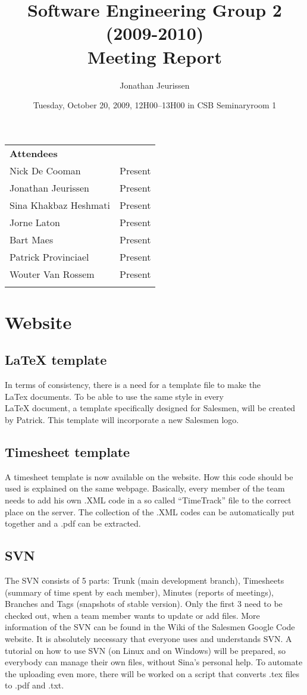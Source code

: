 \documentclass[a4paper, 12pt]{article}
\title{Software Engineering Group 2 (2009-2010) \\Meeting Report}
\author{Jonathan Jeurissen}
\date{ Tuesday, October 20, 2009, 12H00--13H00 in CSB Seminaryroom 1}
\begin{document}
	\maketitle
	
	\begin{tabular}{l l}
		{\large \textbf{Attendees}} \\
		Nick De Cooman & Present \\
		Jonathan Jeurissen & Present \\
		Sina Khakbaz Heshmati & Present \\
		Jorne Laton & Present \\
		Bart Maes & Present \\
		Patrick Provinciael & Present \\
		Wouter Van Rossem & Present \\
		\\
	\end{tabular}	
	
	
	
	
	\section{Website}
	
	\subsection{\LaTeX{} template}
		In terms of consistency, there is a need for a template file to make the \\LaTex{} documents. To be able to use the same style in every \\LaTeX{} document, a template specifically designed for Salesmen, will be created by Patrick. This template will incorporate a new Salesmen logo.
	\subsection{Timesheet template}
A timesheet template is now available on the website\cite{site1}. How this code should be used is explained on the same webpage. Basically, every member of the team needs to add his own .XML code in a so called ``TimeTrack'' file to the correct place on the server. The collection of the .XML codes can be automatically put together and a .pdf can be extracted.
	\subsection{SVN}
The SVN consists of 5 parts: Trunk (main development branch), Timesheets (summary of time spent by each member), Minutes (reports of meetings), Branches and Tags (snapshots of stable version). Only the first 3 need to be checked out, when a team member wants to update or add files. More information of the SVN can be found in the Wiki of the Salesmen Google Code website\cite{site2}. It is absolutely necessary that everyone uses and understands SVN.
A tutorial on how to use SVN (on Linux and on Windows) will be prepared, so everybody can manage their own files, without Sina's personal help. To automate the uploading even more, there will be worked on a script that converts .tex files to .pdf and .txt.
\end{document}
